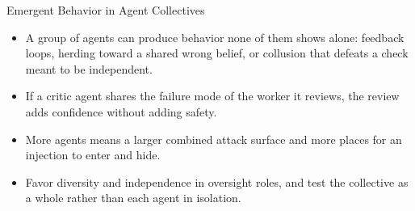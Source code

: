 \begin{frame}{Emergent Behavior in Agent Collectives}
  \begin{itemize}\itemsep0.5em
    \item[\textcolor{KAred}{$\blacktriangleright$}] A group of agents can produce behavior none of them shows alone: feedback loops, herding toward a shared wrong belief, or collusion that defeats a check meant to be independent.
    \item[\textcolor{KAred}{$\blacktriangleright$}] If a critic agent shares the failure mode of the worker it reviews, the review adds confidence without adding safety.
    \item[\textcolor{KAred}{$\blacktriangleright$}] More agents means a larger combined attack surface and more places for an injection to enter and hide.
    \item[\textcolor{KAred}{$\blacktriangleright$}] Favor diversity and independence in oversight roles, and test the collective as a whole rather than each agent in isolation.
  \end{itemize}
\end{frame}
